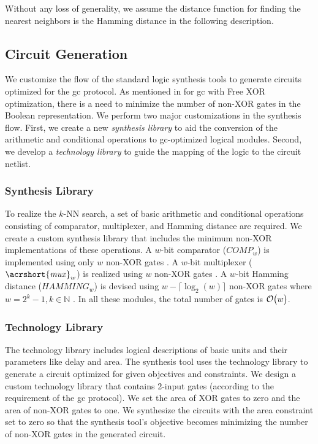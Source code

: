 Without any loss of generality, we assume the distance function for finding the nearest neighbors is the Hamming distance in the following description.

\subsection{Circuit Generation}\label{ssec:knn-circuitgen}
We customize the flow of the standard logic synthesis tools to generate circuits optimized for the \acrshort{gc} protocol.
As mentioned in  for \acrshort{gc} with Free XOR optimization, there is a need to minimize the number of non-XOR gates in the Boolean representation.
We perform two major customizations in the synthesis flow.
First, we create a new \emph{synthesis library} to aid the conversion of the arithmetic and conditional operations to \acrshort{gc}-optimized logical modules.
Second, we develop a \emph{technology library} to guide the mapping of the logic to the circuit \gls{netlist}.

\subsubsection{Synthesis Library}
To realize the $k$-NN search, a set of basic arithmetic and conditional operations consisting of comparator, multiplexer, and Hamming distance are required.
We create a custom synthesis library that includes the minimum non-XOR implementations of these operations.
A $w$-bit comparator ($\mathit{COMP}_w$) is implemented using only $w$ non-XOR gates \cite{kolesnikov2009improved}.
A $w$-bit multiplexer ($\mathit{\acrshort{mux}}_w$) is realized using $w$ non-XOR gates \cite{kolesnikov2008improved}.
A $w$-bit Hamming distance ($\mathit{HAMMING}_w$) is devised using $w-\lceil \log _2(w) \rceil$ non-XOR gates where $w=2^k-1, k \in \mathbb{N}$ \cite{boyar2006concrete}.
In all these modules, the total number of gates is $\mathcal{O}\bigl(w\bigr)$.

\subsubsection{Technology Library}
The technology library includes logical descriptions of basic units and their parameters like delay and area.
The synthesis tool uses the technology library to generate a circuit optimized for given objectives and constraints.
We design a custom technology library that contains 2-input gates (according to the requirement of the \acrshort{gc} protocol).
We set the area of XOR gates to zero and the area of non-XOR gates to one.
We synthesize the circuits with the area constraint set to zero so that the synthesis tool's objective becomes minimizing the number of non-XOR gates in the generated circuit.

